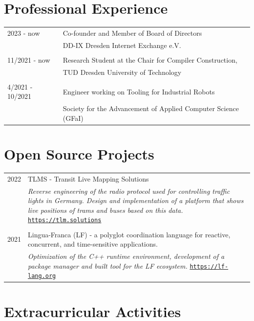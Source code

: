 \documentclass[11pt, a4paper, oneside]{article}
\begin{document}
\section*{Professional Experience}

\begin{tabular}{R{3cm} L{12cm}}
	2023 	- now				& Co-founder and Member of Board of Directors \\ & DD-IX Dresden Internet Exchange e.V. \\ & \\
	11/2021 	- now			& Research Student at the Chair for Compiler Construction, \\ 
										& TUD Dresden University of Technology \\ 
										& 																			\\
	4/2021 - 10/2021    & Engineer working on Tooling for Industrial Robots \\ 
										& Society for the Advancement of Applied Computer Science (GFaI)
\end{tabular}


\section*{Open Source Projects}

\begin{tabular}{R{3cm} L{13cm}}
	2022 							    & TLMS - Transit Live Mapping Solutions \\
	  										&	\emph{Reverse engineering of the radio protocol used for controlling traffic lights in Germany. Design and implementation of a platform that shows live positions of trams and buses based on this data.} \href{https://map.tlm.solutions}{\texttt{https://tlm.solutions}}  \\  
	  										& \\
		2021 							& Lingua-Franca (LF) - a polyglot coordination language for reactive, concurrent, and time-sensitive applications.  \\ 
											& \emph{Optimization of the C++ runtime environment, development  of  a package manager and built tool for the LF ecosystem.} \href{https://lf-lang.org}{\texttt{https://lf-lang.org}} \\
\end{tabular}

\section*{Extracurricular Activities}
\end{document}
